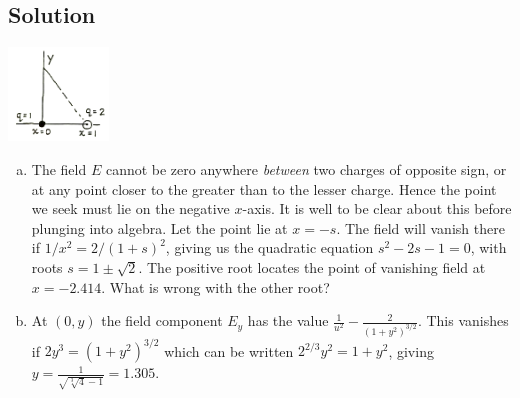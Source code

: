 \documentclass[solutions]{esg8022pset}
\begin{document}
\subsection{Solution}
  \begin{center}\includegraphics[width=0.2\textwidth]{ps01_sol_05}\end{center}
  \begin{enumerate}[(a)]
    \item The field $E$ cannot be zero anywhere \emph{between} two charges of opposite sign, or at any point closer to the greater than to the lesser charge. Hence the point we seek must lie on the negative $x$-axis. It is well to be clear about this before plunging into algebra. Let the point lie at $x = -s$. The field will vanish there if $1 / x^2 = 2 / (1+s)^2$, giving us the quadratic equation $s^2 - 2s - 1 = 0$, with roots $s = 1 \pm \sqrt{2}$. The positive root locates the point of vanishing field at $x = -2.414$.  What is wrong with the other root?
    \item At $(0, y)$ the field component $E_y$ has the value $\frac{1}{u^2} - \frac{2}{(1 + y^2)^{3/2}}$.  This vanishes if $2y^3 = (1 + y^2)^{3/2}$ which can be written $2^{2/3}y^2 = 1 + y^2$, giving $y = \frac{1}{\sqrt{\sqrt[3]{4} - 1}} = 1.305$.
  \end{enumerate}
\end{document}
